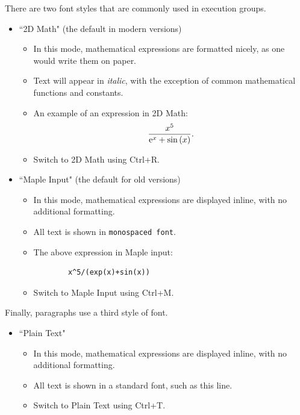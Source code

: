 There are two font styles that are commonly used in execution groups.
\begin{itemize}
\item ``2D Math" (the default in modern versions)
	\begin{itemize}
	\item In this mode, mathematical expressions are formatted nicely, as one would write them on paper. 
	\item Text will appear in \textit{italic}, with the exception of common mathematical functions and constants.
	\item An example of an expression in 2D Math: \[\displaystyle {\frac {{x}^{5}}{{\rm e}^{x}+\sin \left( x \right) }}. \]
	\item Switch to 2D Math using Ctrl+R.
	\end{itemize}
\item ``Maple Input" (the default for old versions)
	\begin{itemize}
	\item In this mode, mathematical expressions are displayed inline, with no additional formatting. 
	\item All text is shown in \texttt{monospaced font}.
	\item The above expression in Maple input: 
		\begin{verbatim}
		x^5/(exp(x)+sin(x))
		\end{verbatim}
	\item Switch to Maple Input using Ctrl+M.
	\end{itemize}
\end{itemize}
Finally, paragraphs use a third style of font.
\begin{itemize}
\item ``Plain Text"
	\begin{itemize}
	\item In this mode, mathematical expressions are displayed inline, with no additional formatting. 
	\item All text is shown in a standard font, such as this line.
	\item Switch to Plain Text using Ctrl+T.
	\end{itemize}
\end{itemize}


